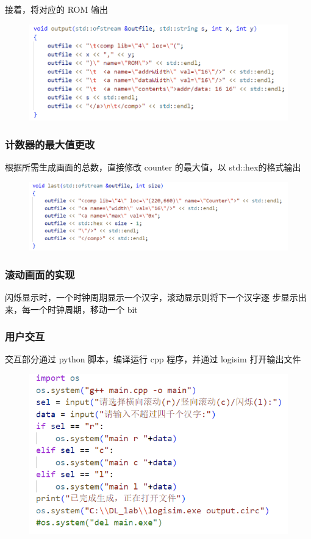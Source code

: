\documentclass{article}
\begin{document}
	接着，将对应的 ROM 输出
	\begin{figure}[htbp]
		\centering
		\includegraphics[scale=0.8]{output.png}
	\end{figure}
	
	\subsubsection{计数器的最大值更改}
	根据所需生成画面的总数，直接修改 counter 的最大值，以 std::hex的格式输出
	\begin{figure}[htbp]
		\centering
		\includegraphics[scale=0.8]{counter.png}
	\end{figure}

	\subsubsection{滚动画面的实现}	
	闪烁显示时，一个时钟周期显示一个汉字，滚动显示则将下一个汉字逐
	步显示出来，每一个时钟周期，移动一个 bit

	\subsubsection{用户交互}
	交互部分通过 python 脚本，编译运行 cpp 程序，并通过 logisim 打开输出文件
	\begin{figure}[htbp]
		\centering
		\includegraphics[scale=0.8]{py.png}
	\end{figure}
\end{document}

